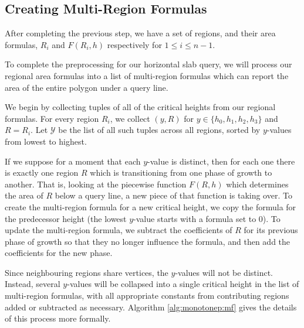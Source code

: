 \subsection{Creating Multi-Region Formulas}
\label{sec:mr_formula}

After completing the previous step, we have a set of regions, and their area formulas, $R_i$ and $F(R_i, h)$ respectively for $1 \leq i \leq n-1$.

To complete the preprocessing for our horizontal slab query, we will process our regional area formulas into a list of multi-region formulas which can report the area of the entire polygon under a query line.

We begin by collecting tuples of all of the critical heights from our regional formulas. 
For every region $R_i$, we collect $(y, R)$ for $y \in \{h_0, h_1, h_2, h_3\}$ and $R = R_i$.
Let $\mathcal{Y}$ be the list of all such tuples across all regions, sorted by $y$-values from lowest to highest.

If we suppose for a moment that each $y$-value is distinct, then for each one there is exactly one region $R$ which is transitioning from one phase of growth to another.
That is, looking at the piecewise function $F(R, h)$ which determines the area of $R$ below a query line, a new piece of that function is taking over.
To create the multi-region formula for a new critical height, we copy the formula for the predecessor height (the lowest $y$-value starts with a formula set to 0).
To update the multi-region formula, we subtract the coefficients of $R$ for its previous phase of growth so that they no longer influence the formula, and then add the coefficients for the new phase.

Since neighbouring regions share vertices, the $y$-values will not be distinct.
Instead, several $y$-values will be collapsed into a single critical height in the list of multi-region formulas, with all appropriate constants from contributing regions added or subtracted as necessary.
Algorithm \ref{alg:monotonep:mf} gives the details of this process more formally.

